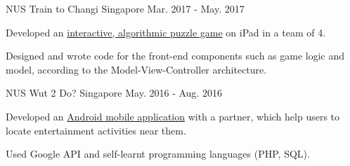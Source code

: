 \begin{cventries}
  \cventry
    {NUS} %
    {Train to Changi} %
    {Singapore} %
    {Mar. 2017 - May. 2017} %
    {
      \begin{cvitems} %
        \item {Developed an \href{https://github.com/Zhiyuan-Amos/Train-to-Changi}{interactive, algorithmic puzzle game} on iPad in a team of 4.}
        \item {Designed and wrote code for the front-end components such as game logic and model, according to the Model-View-Controller architecture.}
      \end{cvitems}
    }
  \cventry
    {NUS} %
    {Wut 2 Do?} %
    {Singapore} %
    {May. 2016 - Aug. 2016} %
    {
      \begin{cvitems} %
        \item {Developed an \href{https://github.com/Zhiyuan-Amos/Wut-2-Do}{Android mobile application} with a partner, which help users to locate entertainment activities near them.}
        \item {Used Google API and self-learnt programming languages (PHP, SQL).}
      \end{cvitems}
    }
\end{cventries}

